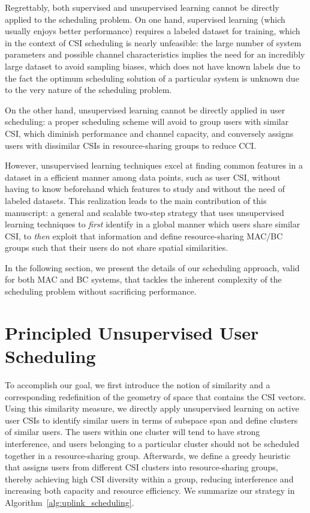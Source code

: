 Regrettably, both supervised and unsupervised learning cannot be directly applied to the scheduling problem.
On one hand, supervised learning (which usually enjoys better performance) requires a labeled dataset for training, which in the context of CSI scheduling is nearly unfeasible: the large number of system parameters and possible channel characteristics implies the need for an incredibly large dataset to avoid sampling biases, which does not have known labels due to the fact the optimum scheduling solution of a particular system is unknown due to the very nature of the scheduling problem. 

On the other hand, unsupervised learning cannot be directly applied in user scheduling: a proper scheduling scheme will avoid to group users with similar CSI, which diminish performance and channel capacity, and conversely assigns users with dissimilar CSIs in resource-sharing groups to reduce CCI.

However, unsupervised learning techniques excel at finding common features in a dataset in a efficient manner among data points, such as user CSI, without having to know beforehand which features to study and without the need of labeled datasets. This realization leads to the main contribution of this manuscript: a general and scalable two-step strategy that uses unsupervised learning techniques to \emph{first} identify in a global manner which users share similar CSI, to \emph{then} exploit that information and define resource-sharing MAC/BC groups such that their users do not share spatial similarities. 

In the following section, we present the details of our scheduling approach, valid for both MAC and BC systems, that tackles the inherent complexity of the scheduling problem without sacrificing performance. 


\section{Principled Unsupervised User Scheduling} \label{sec:USCH_strategy}

To accomplish our goal, we first introduce the notion of similarity and a corresponding redefinition of the geometry of space that contains the CSI vectors. 
Using this similarity measure, we directly apply unsupervised learning on active user CSIs to identify similar users in terms of subspace span and define clusters of similar users. The users within one cluster will tend to have strong interference, and users belonging to a particular cluster should not be scheduled together in a resource-sharing group. 
Afterwards, we define a greedy heuristic that assigns users from different CSI clusters into resource-sharing groups, thereby achieving high CSI diversity within a group, reducing interference and increasing both capacity and resource efficiency.
We summarize our strategy in Algorithm~\ref{alg:uplink_scheduling}.

